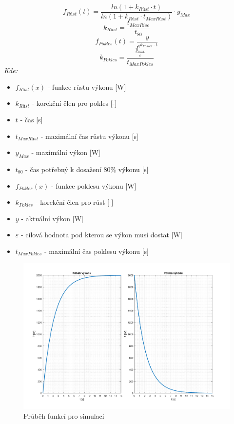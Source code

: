 \begin{equation}
    f_{Růst}(t) = \frac{ln(1 + k_{Růst} \cdot t)}{ln(1 + k_{Růst} \cdot t_{MaxRůst})} \cdot y_{Max}
    \label{eq:funkce_rust}
\end{equation} 
\begin{equation}
    k_{Růst} = \frac{t_{MaxRise}}{t_{80}}
    \label{eq:k_rust}
\end{equation}
\begin{equation}
    f_{Pokles}(t) = \frac{y}{e^{k_{Pokles} \cdot t}}
    \label{eq:funkce_pokles}
\end{equation}
\begin{equation}
    k_{Pokles} = \frac{\frac{y_{max}}{\varepsilon}}{t_{MaxPokles}}
    \label{eq:k_pokles}
\end{equation}
\newpage
\noindent\textit{Kde:}
\begin{itemize}
    \item $f_{Růst}(x)$ - funkce růstu výkonu [W]
    \item $k_{Růst}$ - korekční člen pro pokles [-]
    \item $t$ - čas [s]
    \item $t_{MaxRůst}$ - maximální čas růstu výkonu [s]
    \item $y_{Max}$ - maximální výkon [W]
    \item $t_{80}$ - čas potřebný k dosažení 80\% výkonu [s]
    \item $f_{Pokles}(x)$ - funkce poklesu výkonu [W]
    \item $k_{Pokles}$ - korekční člen pro růst [-] 
    \item $y$ - aktuální výkon [W]
    \item $\varepsilon$ - cílová hodnota pod kterou se výkon musí dostat [W]
    \item $t_{MaxPokles}$ - maximální čas poklesu výkonu [s]
\end{itemize}
\begin{figure}[!ht]
    \begin{center}
        \includegraphics[scale=0.52]{obrazky/simulace_funkce.pdf}
    \end{center}
    \caption[Průběh funkcí pro simulaci]{Průběh funkcí pro simulaci}
    \label{fig:simulace_funkce}
\end{figure}
